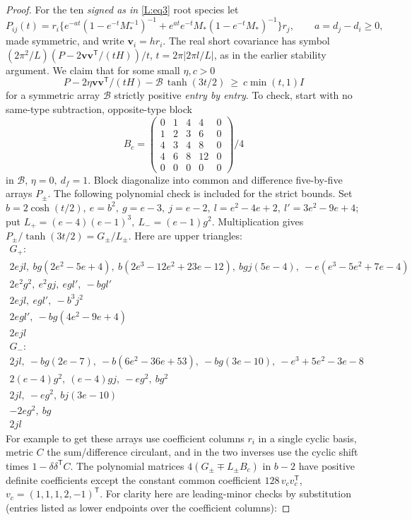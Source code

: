 \documentclass[11pt]{article}
\numberwithin{equation}{section}
\theoremstyle{definition}\newtheorem{definition}[theorem]{Definition}
\theoremstyle{remark}\newtheorem{remark}[theorem]{Remark}
\begin{document}
\begin{proof}
For the ten \emph{signed as in} \eqref{L:eq3} root species let
\[
 P_{ij}(t)
 =r_i\{ e^{-a t}(1-e^{-t}M_*^{-1})^{-1}
       + e^{a t} e^{-t}M_*(1-e^{-t}M_*)^{-1}\}r_j,\qquad a=d_j-d_i\ge0,
\]
made symmetric, and write \(\mathbf v_i=h r_i\). The real short covariance has symbol \((2\pi^2/L)(P-2\mathbf v\mathbf v^{\mathsf T}/(tH))/t\), \(t=2\pi|2\pi l/L|\), as in the earlier stability argument. We claim that for some small \(\eta,c>0\)
\begin{equation}
 P-2\eta\mathbf v\mathbf v^{\mathsf T}/(tH)
      -\mathscr B\,\tanh(3t/2)\ \ge\ c\min(t,1)I\label{L:eq5}
\end{equation}
for a symmetric array \(\mathscr B\) strictly positive \emph{entry by entry}. To check, start with no same-type subtraction, opposite-type block
\[
 B_c=\begin{pmatrix}
0&1&4&4&0\\1&2&3&6&0\\4&3&4&8&0\\4&6&8&12&0\\0&0&0&0&0
\end{pmatrix}/4
\]
in \(\mathscr B\), \(\eta=0,\ d_f=1\). Block diagonalize into common and difference five-by-five arrays \(P_\pm\). The following polynomial check is included for the strict bounds. Set \(b=2\cosh(t/2),\ e=b^2,\ g=e-3,\ j=e-2,\ l=e^2-4e+2,\ l'=3e^2-9e+4\); put \(L_+=(e-4)(e-1)^3,\ L_-=(e-1)g^2\). Multiplication gives \(P_\pm/\tanh(3t/2)=G_\pm/L_\pm\). Here are upper triangles:
\[
\begin{array}{l}
G_+:\\
2 e j l,\ b g(2e^2-5e+4),\ b(2e^3-12e^2+23e-12),\ b g j(5e-4),\
 -e(e^3-5e^2+7e-4)\\
2e^2g^2,\ e^2g j,\ e g l',\ -b g l'\\
2e j l,\ e g l',\ -b^3 j^2\\
2e g l',\ -b g(4e^2-9e+4)\\
2e j l\\[2pt]
G_-:\\
2j l,\ -b g(2e-7),\ -b(6e^2-36e+53),\ -b g(3e-10),\ -e^3+5e^2-3e-8\\
2(e-4)g^2,\ (e-4)g j,\ -e g^2,\ b g^2\\
2j l,\ -e g^2,\ b j(3e-10)\\
-2e g^2,\ b g\\
2j l
\end{array}
\]
For example to get these arrays use coefficient columns \(r_i\) in a single cyclic basis, metric \(C\) the sum/difference circulant, and in the two inverses use the cyclic shift times \(1-\delta\delta^{\mathsf T}C\). The polynomial matrices \(4(G_\pm\mp L_\pm B_c)\) in \(b-2\) have positive definite coefficients except the constant common coefficient \(128\,v_c v_c^{\mathsf T}\), \(v_c=(1,1,1,2,-1)^{\mathsf T}\). For clarity here are leading-minor checks by substitution (entries listed as lower endpoints over the coefficient columns):

\end{proof}
\end{document}
